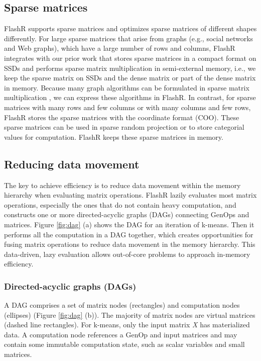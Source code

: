 \subsection{Sparse matrices}
FlashR supports sparse matrices and optimizes sparse matrices of different
shapes differently.
For large sparse matrices that arise from graphs (e.g., social networks
and Web graphs), which have a large number of rows and columns, FlashR integrates
with our prior work \cite{SEM_SpMM} that stores sparse matrices
in a compact format on SSDs and performs sparse matrix multiplication
in semi-external memory, i.e., we keep the sparse matrix on SSDs and
the dense matrix or part of the dense matrix in memory.
Because many graph algorithms can be formulated in sparse matrix multiplication
\cite{linear_algebra}, we can express these algorithms in FlashR. In contrast,
for sparse matrices with many rows and few columns or with many columns
and few rows, FlashR stores the sparse matrices with the coordinate format
(COO). These sparse matrices can be used in sparse random projection
\cite{sparse_proj} or to store categorial values for computation.
FlashR keeps these sparse matrices in memory.

\subsection{Reducing data movement}\label{sec:datamove}
The key to achieve efficiency is to reduce data movement within the memory hierarchy
when evaluating matrix operations. FlashR lazily evaluates most matrix
operations, especially the ones that do not contain heavy computation,
and constructs one or more directed-acyclic graphs (DAGs) connecting GenOps and
matrices. Figure \ref{fig:dag} (a) shows the DAG for an iteration of k-means.
Then it performs all the computation in a DAG together, which creates opportunities
for fusing matrix operations to reduce data movement in the memory hierarchy.
This data-driven, lazy evaluation allows out-of-core problems 
to approach in-memory efficiency.

\subsubsection{Directed-acyclic graphs (DAGs)} \label{dag}
A DAG comprises a set of matrix nodes (rectangles) and computation nodes
(ellipses) (Figure \ref{fig:dag} (b)). The majority of matrix nodes are
virtual matrices (dashed line rectangles).
For k-means, only the input matrix \textit{X} has materialized data.
A computation node references a GenOp and input matrices and
may contain some immutable computation state, such as scalar variables and
small matrices. 

